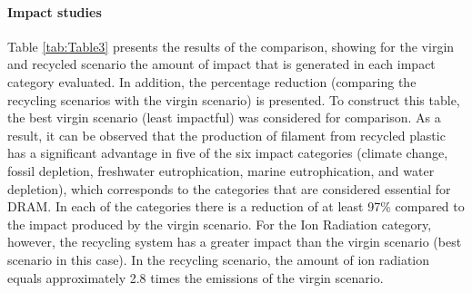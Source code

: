 \documentclass[12pt]{elsarticle} %
\begin{document}
\hypertarget{impact}{%
\paragraph{Impact studies}\label{impact}}

Table \ref{tab:Table3} presents the results of the comparison, showing for the virgin and recycled scenario the amount of impact that is generated in each impact category evaluated.
In addition, the percentage reduction (comparing the recycling scenarios with the virgin scenario) is presented.
To construct this table, the best virgin scenario (least impactful) was considered for comparison.
As a result, it can be observed that the production of filament from recycled plastic has a significant advantage in five of the six impact categories (climate change, fossil depletion, freshwater eutrophication, marine eutrophication, and water depletion), which corresponds to the categories that are considered essential for DRAM.
In each of the categories there is a reduction of at least 97\% compared to the impact produced by the virgin scenario.
For the Ion Radiation category, however, the recycling system has a greater impact than the virgin scenario (best scenario in this case).
In the recycling scenario, the amount of ion radiation equals approximately 2.8 times the emissions of the virgin scenario.
\end{document}
